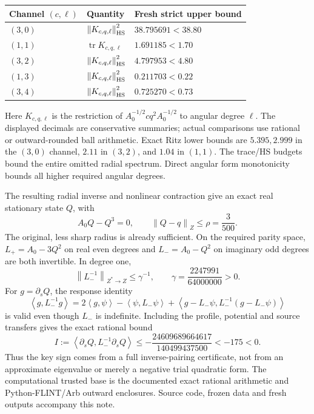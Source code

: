 \documentclass[11pt,a4paper]{article}
\newcommand{\norm}[1]{\left\|#1\right\|}
\newcommand{\ip}[2]{\left\langle#1,#2\right\rangle}
\begin{document}
\begin{center}\small
\begin{tabular}{@{}lll@{}}
\toprule
Channel $(c,\ell)$ & Quantity & Fresh strict upper bound\\\midrule
$(3,0)$ & $\norm{K_{c,q,\ell}}_{\rm HS}^2$ & $38.795691<38.80$\\
$(1,1)$ & $\operatorname{tr}K_{c,q,\ell}$ & $1.691185<1.70$\\
$(3,2)$ & $\norm{K_{c,q,\ell}}_{\rm HS}^2$ & $4.797953<4.80$\\
$(1,3)$ & $\norm{K_{c,q,\ell}}_{\rm HS}^2$ & $0.211703<0.22$\\
$(3,4)$ & $\norm{K_{c,q,\ell}}_{\rm HS}^2$ & $0.725270<0.73$\\\bottomrule
\end{tabular}
\end{center}
Here $K_{c,q,\ell}$ is the restriction of $A_0^{-1/2}cq^2A_0^{-1/2}$ to angular degree $\ell$. The displayed decimals are conservative summaries; actual comparisons use rational or outward-rounded ball arithmetic. Exact Ritz lower bounds are $5.395,2.999$ in the $(3,0)$ channel, $2.11$ in $(3,2)$, and $1.04$ in $(1,1)$. The trace/HS budgets bound the entire omitted radial spectrum. Direct angular form monotonicity bounds all higher required angular degrees.

The resulting radial inverse and nonlinear contraction give an exact real stationary state $Q$, with
\[
 A_0Q-Q^3=0,\qquad \norm{Q-q}_Z\le\rho=\frac3{500}.
\]
The original, less sharp radius is already sufficient. On the required parity space, $L_+=A_0-3Q^2$ on real even degrees and $L_-=A_0-Q^2$ on imaginary odd degrees are both invertible. In degree one,
\[
 \norm{L_-^{-1}}_{Z^*\to Z}\le\gamma^{-1},\qquad
 \gamma=\frac{2247991}{64000000}>0.
\]
For $g=\partial_sQ$, the response identity
\[
 \ip g{L_-^{-1}g}=2\ip g\psi-\ip\psi{L_-\psi}
 +\ip{g-L_-\psi}{L_-^{-1}(g-L_-\psi)}
\]
is valid even though $L_-$ is indefinite. Including the profile, potential and source transfers gives the exact rational bound
\begin{equation}\label{Inegative}
 I:=\ip{\partial_sQ}{L_-^{-1}\partial_sQ}
 \le-\frac{24609689664617}{140499437500}<-175<0.
\end{equation}
Thus the key sign comes from a full inverse-pairing certificate, not from an approximate eigenvalue or merely a negative trial quadratic form. The computational trusted base is the documented exact rational arithmetic and Python-FLINT/Arb outward enclosures. Source code, frozen data and fresh outputs accompany this note.
\end{document}
